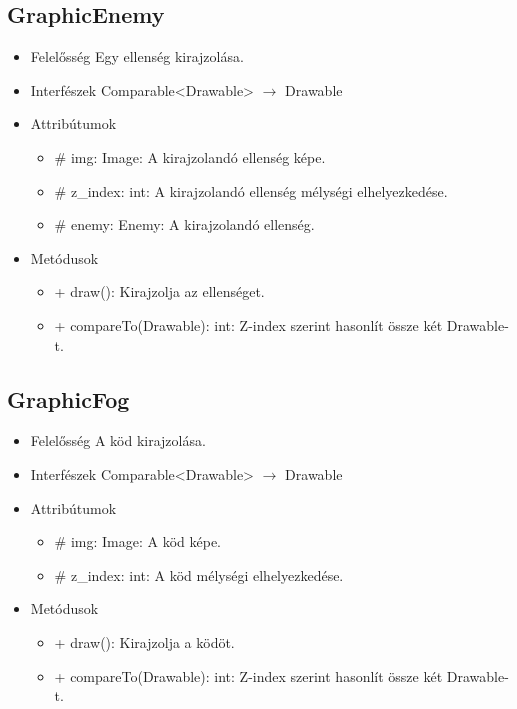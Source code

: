 \subsection{GraphicEnemy}
\begin{itemize}
\item Felelősség\newline
Egy ellenség kirajzolása.
\item Interfészek\newline
Comparable<Drawable> $\rightarrow$ Drawable
\item Attribútumok\newline
	\begin{itemize}
		\item \# img: Image: A kirajzolandó ellenség képe.
		\item \# z\_index: int: A kirajzolandó ellenség mélységi elhelyezkedése.
		\item \# enemy: Enemy: A kirajzolandó ellenség.
	\end{itemize}
\item Metódusok\newline
	\begin{itemize}
		\item + draw(): Kirajzolja az ellenséget.
		\item + compareTo(Drawable): int: Z-index szerint hasonlít össze két Drawable-t.
	\end{itemize}
\end{itemize}

\subsection{GraphicFog}
\begin{itemize}
\item Felelősség\newline
A köd kirajzolása.
\item Interfészek\newline
Comparable<Drawable> $\rightarrow$ Drawable
\item Attribútumok\newline
	\begin{itemize}
		\item \# img: Image: A köd képe.
		\item \# z\_index: int: A köd mélységi elhelyezkedése.
	\end{itemize}
\item Metódusok\newline
	\begin{itemize}
		\item + draw(): Kirajzolja a ködöt.
		\item + compareTo(Drawable): int: Z-index szerint hasonlít össze két Drawable-t.
	\end{itemize}
\end{itemize}

